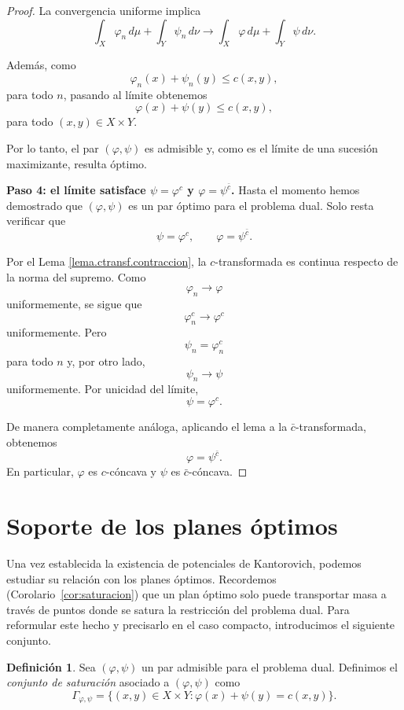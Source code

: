\documentclass[12pt, a4paper]{amsbook}
\theoremstyle{remark}
\theoremstyle{definition}
\newtheorem{defi}[teo]{Definición}
\numberwithin{section}{chapter}
\numberwithin{subsection}{section}
\numberwithin{equation}{section}
\numberwithin{figure}{chapter}
\begin{document}
\begin{proof}
La convergencia uniforme implica
\[
\int_X\varphi_n\,d\mu
+
\int_Y\psi_n\,d\nu
\longrightarrow
\int_X\varphi\,d\mu
+
\int_Y\psi\,d\nu.
\]

Además, como
\[
\varphi_n(x)+\psi_n(y)\leq c(x,y),
\]
para todo \(n\), pasando al límite obtenemos
\[
\varphi(x)+\psi(y)\leq c(x,y),
\]
para todo $(x,y)\in X\times Y$.

Por lo tanto, el par $(\varphi,\psi)$ es admisible y, como es el límite de
una sucesión maximizante, resulta óptimo.

\medskip\noindent\textbf{Paso 4: el límite satisface $\psi=\varphi^c$ y
$\varphi=\psi^{\bar c}$.}
Hasta el momento hemos demostrado que $(\varphi,\psi)$ es un par óptimo para
el problema dual. Solo resta verificar que
\[
\psi=\varphi^c,
\qquad
\varphi=\psi^{\bar c}.
\]

Por el Lema \ref{lema.ctransf.contraccion}, la $c$-transformada es continua respecto de la norma
del supremo. Como
\[
\varphi_n\longrightarrow\varphi
\]
uniformemente, se sigue que
\[
\varphi_n^c
\longrightarrow
\varphi^c
\]
uniformemente. Pero
\[
\psi_n=\varphi_n^c
\]
para todo $n$ y, por otro lado,
\[
\psi_n\longrightarrow\psi
\]
uniformemente. Por unicidad del límite,
\[
\psi=\varphi^c.
\]

De manera completamente análoga, aplicando el lema a la
$\bar c$-transformada, obtenemos
\[
\varphi=\psi^{\bar c}.
\]
En particular, $\varphi$ es $c$-cóncava y $\psi$ es
$\bar c$-cóncava.
\end{proof}


\section{Soporte de los planes óptimos}\label{sec.soporte.planes}

Una vez establecida la existencia de potenciales de Kantorovich, podemos
estudiar su relación con los planes óptimos. Recordemos
(Corolario~\ref{cor:saturacion}) que un plan óptimo solo puede transportar
masa a través de puntos donde se satura la restricción del problema dual.
Para reformular este hecho y precisarlo en el caso compacto, introducimos el
siguiente conjunto.

\begin{defi}\label{def.saturacion}
Sea $(\varphi,\psi)$ un par admisible para el problema dual. Definimos el
\emph{conjunto de saturación} asociado a $(\varphi,\psi)$ como
\[
\Gamma_{\varphi,\psi}
=
\bigl\{
(x,y)\in X\times Y:
\varphi(x)+\psi(y)=c(x,y)
\bigr\}.
\]
\end{defi}
\end{document}
